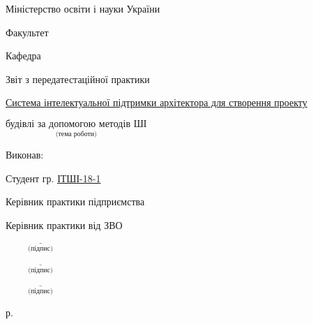 \begin{titlepage}
    \setlength\parindent{0pt}
    \begin{center}
        
    
    Міністерство освіти і науки України

    \University

    \vspace{1.5ex}
    
    \vspace{10ex}

    Факультет \uline{\hfill \Speciality \hfill}
    \vspace{\baselineskip}

    Кафедра \uline{\hfill \Department \hfill}

    \vspace{10ex}

    Звіт з передатестаційної практики

    \vspace{1.5\baselineskip}


    \uline{\hfill Система інтелектуальної підтримки архітектора для створення проекту \hfill}
    
    \uline{\hfill$\underset{\text{(тема роботи)}}{\text{будівлі за допомогою методів ШІ}}$\hfill}

    \end{center}
    \vspace{2cm}
    Виконав:

    \begin{minipage}[t]{32ex}

        Студент гр. \uline{\hspace{1em}ІТШІ-18-1\hspace{1em}}
        \vspace{\baselineskip}

        Керівник практики підприємства
        \vspace{\baselineskip}

        Керівник практики від ЗВО

    \end{minipage}
    \begin{minipage}[t]{9.4cm}
        \hfill $\underset{\text{(підпис)}}{\underline{\hspace{3cm}}}$ \hfill \wideunderline[10em]{\StundentName} 
        \vspace{\baselineskip}

        \hfill $\underset{\text{(підпис)}}{\underline{\hspace{3cm}}}$ \hfill \wideunderline[10em]{\MainMemberUnivercity}
        \vspace{\baselineskip}

        \hfill $\underset{\text{(підпис)}}{\underline{\hspace{3cm}}}$ \hfill \wideunderline[10em]{\MainMemberUnivercity}
    \end{minipage}


     
    

    \vspace{7ex}
    \hfill
    
    \vfill
    \centering
	{\the\year{} р.}
\end{titlepage}
